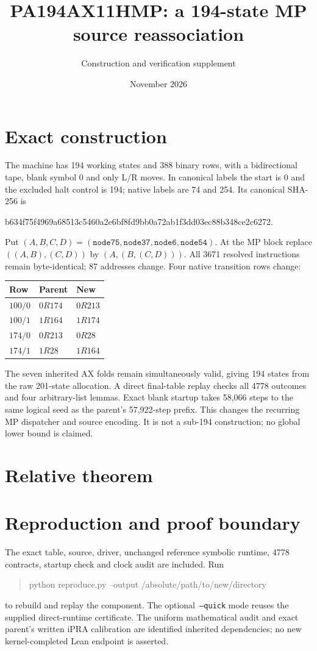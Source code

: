 \documentclass[11pt]{article}
\title{PA194AX11HMP: a 194-state MP source reassociation}
\author{Construction and verification supplement}
\date{November 2026}
\begin{document}
\maketitle
\section{Exact construction}
The machine has 194 working states and 388 binary rows, with a bidirectional
tape, blank symbol 0 and only L/R moves. In canonical labels the start is 0
and the excluded halt control is 194; native labels are 74 and 254.
Its canonical SHA-256 is
\begin{center}\small\ttfamily
b634f75f4969a68513c5460a2e6bf8fd9bb0a72ab1f3dd03ec88b348ce2c6272.
\end{center}
Put $(A,B,C,D)=(\texttt{node75},\texttt{node37},\texttt{node6},\texttt{node54})$.
At the MP block replace $((A,B),(C,D))$ by $(A,(B,(C,D)))$.
All 3671 resolved instructions remain byte-identical; 87 addresses change.
Four native transition rows change:
\begin{center}\begin{tabular}{lll}\toprule
Row&Parent&New\\\midrule
$100/0$&$0R174$&$0R213$\\
$100/1$&$1R164$&$1R174$\\
$174/0$&$0R213$&$0R28$\\
$174/1$&$1R28$&$1R164$\\\bottomrule
\end{tabular}\end{center}
The seven inherited AX folds remain simultaneously valid, giving 194 states
from the raw 201-state allocation. A direct final-table replay checks all 4778
outcomes and four arbitrary-list lemmas. Exact blank startup takes 58,066
steps to the same logical seed as the parent's 57,922-step prefix.
This changes the recurring MP dispatcher and source encoding. It is not a
sub-194 construction; no global lower bound is claimed.
\section{Relative theorem}

\section{Reproduction and proof boundary}
The exact table, source, driver, unchanged reference symbolic runtime,
4778 contracts, startup check and clock audit are included. Run
\begin{quote}\ttfamily
python reproduce.py --output /absolute/path/to/new/directory
\end{quote}
to rebuild and replay the component. The optional\texttt{ --quick} mode
reuses the supplied direct-runtime certificate. The uniform mathematical
audit and exact parent's written iPRA calibration are identified inherited
dependencies; no new kernel-completed Lean endpoint is asserted.
\end{document}
